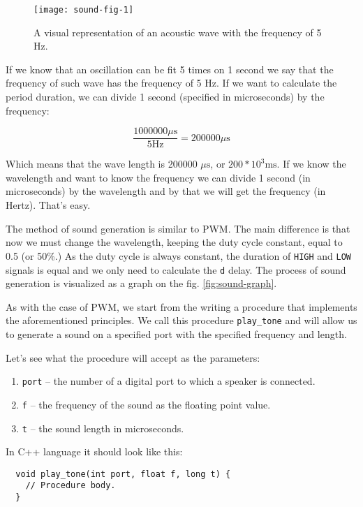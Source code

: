 \documentclass[../sparc.tex]{subfiles}
\begin{document}
\begin{figure}[h]
  \centering
  \texttt{[image: sound-fig-1]}
  \caption{A visual representation of an acoustic wave with the frequency of 5
    Hz.}
  \label{fig:sound-fig-1}
\end{figure}

If we know that an oscillation can be fit 5 times on 1 second we say that the
frequency of such wave has the frequency of 5 Hz.  If we want to calculate the
period duration, we can divide 1 second (specified in microseconds) by the
frequency:

\begin{equation}
  \frac{1000000 \mu\mbox{s}}{5 \mbox{Hz}} = 200000 \mu\mbox{s}
\end{equation}

Which means that the wave length is 200000 $\mu\mbox{s}$, or $ 200 * 10^3
\mbox{ms}$.  If we know the wavelength and want to know the frequency we can
divide 1 second (in microseconds) by the wavelength and by that we will get the
frequency (in Hertz).  That's easy.


The method of sound generation is similar to \gls{PWM}. The main difference is
that now we must change the wavelength, keeping the duty cycle constant, equal
to 0.5 (or 50\%.)  As the duty cycle is always constant, the duration of
\texttt{HIGH} and \texttt{LOW} signals is equal and we only need to calculate
the \texttt{d} delay.  The process of sound generation is visualized as a graph
on the fig. \ref{fig:sound-graph}.

As with the case of PWM, we start from the writing a procedure that implements
the aforementioned principles.  We call this procedure \texttt{play\_tone} and
will allow us to generate a sound on a specified port with the specified
frequency and length.

Let's see what the procedure will accept as the parameters:
\begin{enumerate}
\item \texttt{port} -- the number of a digital port to which a speaker is
  connected.
\item \texttt{f} -- the frequency of the sound as the floating point value.
\item \texttt{t} -- the sound length in microseconds.
\end{enumerate}

In C++ language it should look like this:
\begin{verbatim}
  void play_tone(int port, float f, long t) {
    // Procedure body.
  }
\end{verbatim}
\end{document}

